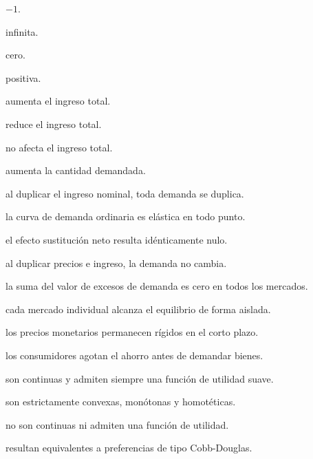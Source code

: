 \begin{opts}
    \item $-1$.
    \item infinita.
    \item cero.
    \item positiva.
\end{opts}

\begin{opts}
    \item aumenta el ingreso total.
    \item reduce el ingreso total.
    \item no afecta el ingreso total.
    \item aumenta la cantidad demandada.
\end{opts}

\begin{opts}
    \item al duplicar el ingreso nominal, toda demanda se duplica.
    \item la curva de demanda ordinaria es elástica en todo punto.
    \item el efecto sustitución neto resulta idénticamente nulo.
    \item al duplicar precios e ingreso, la demanda no cambia.
\end{opts}

\begin{opts}
    \item la suma del valor de excesos de demanda es cero en todos los mercados.
    \item cada mercado individual alcanza el equilibrio de forma aislada.
    \item los precios monetarios permanecen rígidos en el corto plazo.
    \item los consumidores agotan el ahorro antes de demandar bienes.
\end{opts}

\begin{opts}
    \item son continuas y admiten siempre una función de utilidad suave.
    \item son estrictamente convexas, monótonas y homotéticas.
    \item no son continuas ni admiten una función de utilidad.
    \item resultan equivalentes a preferencias de tipo Cobb-Douglas.
\end{opts}


